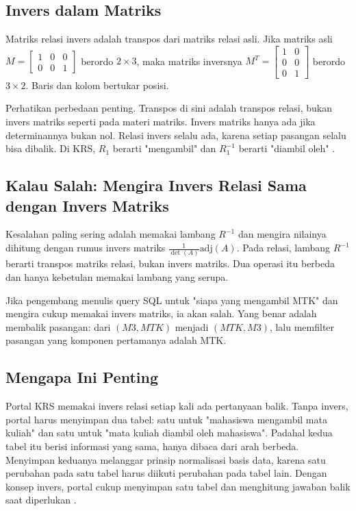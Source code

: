 \documentclass[11pt,a4paper]{article}
\begin{document}
\subsection{Invers dalam Matriks}

Matriks relasi invers adalah transpos dari matriks relasi asli. Jika matriks asli $M=\begin{bmatrix}1&0&0\\0&0&1\end{bmatrix}$ berordo $2 \times 3$, maka matriks inversnya $M^T=\begin{bmatrix}1&0\\0&0\\0&1\end{bmatrix}$ berordo $3 \times 2$. Baris dan kolom bertukar posisi.

Perhatikan perbedaan penting. Transpos di sini adalah transpos relasi, bukan invers matriks seperti pada materi matriks. Invers matriks hanya ada jika determinannya bukan nol. Relasi invers selalu ada, karena setiap pasangan selalu bisa dibalik. Di KRS, $R_1$ berarti "mengambil" dan $R_1^{-1}$ berarti "diambil oleh" \cite{date}.

\subsection{Kalau Salah: Mengira Invers Relasi Sama dengan Invers Matriks}

Kesalahan paling sering adalah memakai lambang $R^{-1}$ dan mengira nilainya dihitung dengan rumus invers matriks $\frac{1}{\det(A)}\text{adj}(A)$. Pada relasi, lambang $R^{-1}$ berarti transpos matriks relasi, bukan invers matriks. Dua operasi itu berbeda dan hanya kebetulan memakai lambang yang serupa.

Jika pengembang menulis query SQL untuk "siapa yang mengambil MTK" dan mengira cukup memakai invers matriks, ia akan salah. Yang benar adalah membalik pasangan: dari $(M3, MTK)$ menjadi $(MTK, M3)$, lalu memfilter pasangan yang komponen pertamanya adalah MTK.

\subsection{Mengapa Ini Penting}

Portal KRS memakai invers relasi setiap kali ada pertanyaan balik. Tanpa invers, portal harus menyimpan dua tabel: satu untuk "mahasiswa mengambil mata kuliah" dan satu untuk "mata kuliah diambil oleh mahasiswa". Padahal kedua tabel itu berisi informasi yang sama, hanya dibaca dari arah berbeda. Menyimpan keduanya melanggar prinsip normalisasi basis data, karena satu perubahan pada satu tabel harus diikuti perubahan pada tabel lain. Dengan konsep invers, portal cukup menyimpan satu tabel dan menghitung jawaban balik saat diperlukan \cite{silberschatz}.
\end{document}
